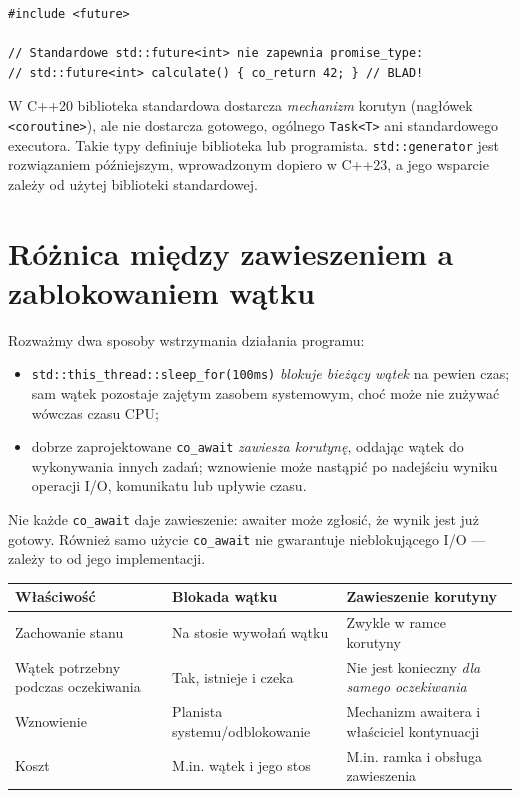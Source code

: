 \begin{lstlisting}[caption={Niepoprawna intuicja: std::future nie jest automatycznie typem korutyny (C++20); fragment celowo błędny.}]
#include <future>

// Standardowe std::future<int> nie zapewnia promise_type:
// std::future<int> calculate() { co_return 42; } // BLAD!
\end{lstlisting}

W C++20 biblioteka standardowa dostarcza \emph{mechanizm} korutyn
(nagłówek \texttt{<coroutine>}), ale nie dostarcza gotowego, ogólnego
\texttt{Task<T>} ani standardowego executora. Takie typy definiuje
biblioteka lub programista. \texttt{std::generator} jest rozwiązaniem
późniejszym, wprowadzonym dopiero w C++23, a jego wsparcie zależy
od użytej biblioteki standardowej.

\section{Różnica między zawieszeniem a zablokowaniem wątku}
\label{sec:cpp15-suspend-block}

Rozważmy dwa sposoby wstrzymania działania programu:
\begin{itemize}
\item \texttt{std::this\_thread::sleep\_for(100ms)} \emph{blokuje
      bieżący wątek} na pewien czas; sam wątek pozostaje zajętym
      zasobem systemowym, choć może nie zużywać wówczas czasu CPU;
\item dobrze zaprojektowane \texttt{co\_await} \emph{zawiesza
      korutynę}, oddając wątek do wykonywania innych zadań;
      wznowienie może nastąpić po nadejściu wyniku operacji I/O,
      komunikatu lub upływie czasu.
\end{itemize}

Nie każde \texttt{co\_await} daje zawieszenie: awaiter może zgłosić,
że wynik jest już gotowy. Również samo użycie \texttt{co\_await}
nie gwarantuje nieblokującego I/O --- zależy to od jego implementacji.

\begin{center}
\small
\begin{tabularx}{\textwidth}{@{}lXX@{}}
\toprule
\textbf{Właściwość} & \textbf{Blokada wątku} & \textbf{Zawieszenie korutyny} \\
\midrule
Zachowanie stanu & Na stosie wywołań wątku & Zwykle w ramce korutyny \\
Wątek potrzebny podczas oczekiwania & Tak, istnieje i czeka & Nie jest konieczny \emph{dla samego oczekiwania} \\
Wznowienie & Planista systemu/odblokowanie & Mechanizm awaitera i właściciel kontynuacji \\
Koszt & M.in. wątek i jego stos & M.in. ramka i obsługa zawieszenia \\
\bottomrule
\end{tabularx}
\end{center}

